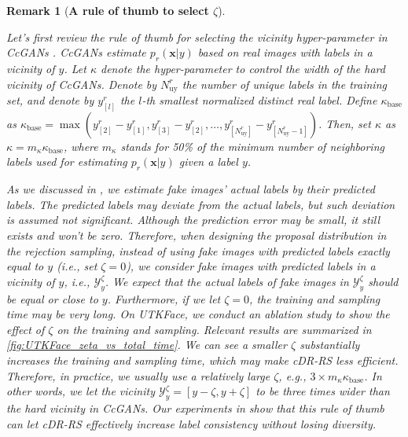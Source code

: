 \documentclass[final,12pt, 3p,times]{elsarticle}
\newtheorem{remark}{Remark}
\begin{document}
\begin{remark}[\textbf{A rule of thumb to select $\zeta$}]\label{rmk:rule_of_thumb_for_zeta}
    {\color{black}
    
    Let's first review the rule of thumb for selecting the vicinity hyper-parameter in CcGANs \cite{ding2021ccgan, ding2020continuous}. CcGANs estimate $p_r(\bm{x}|y)$ based on real images with labels in a vicinity of $y$. Let $\kappa$ denote the hyper-parameter to control the width of the hard vicinity of CcGANs. Denote by $N^r_{\text{uy}}$ the number of unique labels in the training set, and denote by $y^r_{[l]}$ the $l$-th smallest normalized distinct real label. Define $\kappa_{\text{base}}$ as $\kappa_{\text{base}}=\max\left(y^r_{[2]}-y^r_{[1]},  y^r_{[3]}-y^r_{[2]}, \dots,  y^r_{[N^r_{\text{uy}}]}-y^r_{[N^r_{\text{uy}}-1]} \right)$. Then, \cite{ding2021ccgan, ding2020continuous} set $\kappa$ as $\kappa=m_{\kappa}\kappa_{\text{base}}$, where $m_{\kappa}$ stands for 50\% of the minimum number of neighboring labels used for estimating $p_r(\bm{x}|y)$ given a label $y$. 
    
    As we discussed in , we estimate fake images' actual labels by their predicted labels. The predicted labels may deviate from the actual labels, but such deviation is assumed not significant. Although the prediction error may be small, it still exists and won't be zero. Therefore, when designing the proposal distribution in the rejection sampling, instead of using fake images with predicted labels exactly equal to $y$ (i.e., set $\zeta=0$), we consider fake images with predicted labels in a vicinity of $y$, i.e., $\mathcal{Y}_y^\zeta$. We expect that the actual labels of fake images in $\mathcal{Y}_y^\zeta$ should be equal or close to $y$. Furthermore, if we let $\zeta=0$, the training and sampling time may be very long. On UTKFace, we conduct an ablation study to show the effect of $\zeta$ on the training and sampling. Relevant results are summarized in \cref{fig:UTKFace_zeta_vs_total_time}. We can see a smaller $\zeta$ substantially increases the training and sampling time, which may make cDR-RS less efficient. Therefore, in practice, we usually use a relatively large $\zeta$, e.g., $3\times m_{\kappa}\kappa_{\text{base}}$. In other words, we let the vicinity $\mathcal{Y}_y^{\zeta}=[y-\zeta, y+\zeta]$ to be three times wider than the hard vicinity in CcGANs. Our experiments in  show that this rule of thumb can let cDR-RS effectively increase label consistency without losing diversity.
    
}
\end{remark}
\end{document}
